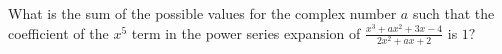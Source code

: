 What is the sum of the possible values for the complex number $a$ such that the coefficient of the $x^5$ term in the power series expansion of $\tfrac{x^3+ax^2+3x-4}{2x^2+ax+2}$ is $1?$